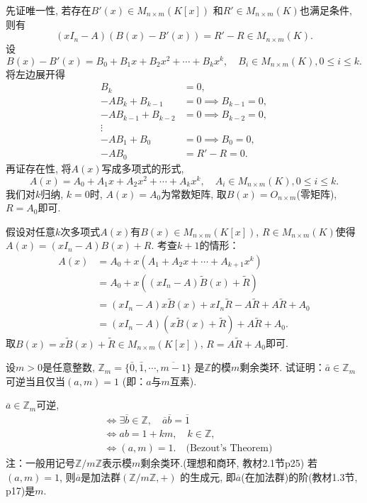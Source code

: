 \begin{solution}
    先证唯一性, 若存在$B'(x) \in M_{n \times m}(K[x])$
和$R' \in M_{n \times m}(K)$也满足条件, 则有
    \[
        (xI_n - A)(B(x) - B'(x)) = R' - R \in M_{n \times m}(K).
    \]
    设
\[
    B(x) - B'(x) = B_0 + B_1x + B_2x^2 + \cdots + B_kx^k, \quad B_i \in M_{n \times m}(K), 0 \leqslant i \leqslant k.
\]
    将左边展开得
\[
\begin{aligned}
    B_k &= 0,\\
    -AB_k + B_{k - 1} &= 0 \implies B_{k - 1} = 0,\\
    -AB_{k - 1} + B_{k - 2} &= 0 \implies B_{k - 2} = 0,\\
    \vdots\\
    -AB_1 + B_0 &= 0 \implies B_0 = 0,\\
    -AB_0 &= R' - R = 0.
\end{aligned}
\]
    再证存在性, 将$A(x)$写成多项式的形式,
\[
    A(x) = A_0 + A_1x + A_2x^2 + \cdots + A_kx^k, \quad A_i \in M_{n \times m}(K), 0 \leqslant i \leqslant k.
\]
我们对$k$归纳, $k = 0$时, $A(x) = A_0$为常数矩阵, 取$B(x) = O_{n \times m}$(零矩阵), 
$R = A_0$即可.

假设对任意$k$次多项式$A(x)$有$B(x) \in M_{n \times m}(K[x])$, $R \in M_{n \times m}(K)$使得
$A(x) = (xI_n - A)B(x) + R$. 考查$k + 1$的情形：
\[
\begin{aligned}
    A(x) &= A_0 + x(A_1 + A_2x + \cdots + A_{k + 1}x^k)\\
    &= A_0 + x((xI_n - A)\tilde{B}(x) + \tilde{R})\\
    &= (xI_n - A)x\tilde{B}(x) + xI_n\tilde{R} - A\tilde{R} + A\tilde{R}+ A_0\\
    &= (xI_n - A)(x\tilde{B}(x) + \tilde{R}) + A\tilde{R} + A_0.
\end{aligned}
\]
取$B(x) = x\tilde{B}(x) + \tilde{R} \in M_{n \times m}(K[x])$, 
$R = A\tilde{R} + A_0$即可.
\end{solution}

\begin{problem}
    设$m > 0$是任意整数, $\mathbb{Z}_m = \{\bar{0}, \bar{1}, \cdots, \overline{m-1}\}$
是$\mathbb{Z}$的模$m$剩余类环. 试证明：$\bar{a} \in \mathbb{Z}_m$可逆当且仅当$(a, m) = 1$
(即：$a$与$m$互素).
\end{problem}

\begin{solution}
    $\overline{a} \in \mathbb{Z}_m$可逆, 
\[
\begin{aligned}
    &\iff \exists \overline{b} \in \mathbb{Z}, \quad \overline{a}\overline{b} = \overline{1}\\
    &\iff ab = 1 + km, \quad k \in \mathbb{Z},\\
    &\iff (a, m) = 1. \quad \text{(Bezout's Theorem)}
\end{aligned}
\]
注：一般用记号$\mathbb{Z}/m\mathbb{Z}$表示模$m$剩余类环.(理想和商环, 教材2.1节p25)
若$(a, m) = 1$, 则$\overline{a}$是加法群$(\mathbb{Z}/m\mathbb{Z}, +)$
的生成元, 即$\overline{a}$(在加法群)的阶(教材1.3节, p17)是$m$.
\end{solution}

